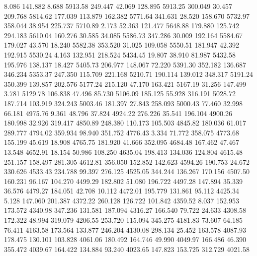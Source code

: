    8.086  141.882    8.688      5913.58
 249.447   42.069  128.895      5913.25
 300.049   30.457  209.768      5814.62
 177.039  113.879  162.382      5771.64
 341.631   28.520  158.670      5732.97
 358.044   38.954  225.737      5710.89
   2.173   52.363  121.477      5648.88
 179.880  125.742  294.183      5610.04
 160.276   30.585   34.085      5586.73
 347.286   30.009  192.164      5584.67
 179.027   43.570   18.240      5582.38
 353.520   31.025  109.058      5550.51
 181.947   42.392  192.915      5530.24
   4.163  132.951  218.524      5434.45
  19.807   38.910   81.987      5432.58
 195.976  138.137   18.427      5405.73
 206.977  148.067   72.220      5391.30
 352.182  136.687  346.234      5353.37
 247.350  115.709  221.168      5210.71
 190.114  139.012  348.317      5191.24
 350.399  139.857  202.576      5177.24
 215.120   47.170  163.421      5167.19
  31.256  147.499    3.781      5129.78
 106.838   47.496   85.730      5106.09
 185.125   55.928  316.191      5028.72
 187.714  103.919  324.243      5003.46
 181.397   27.843  258.093      5000.43
  77.460   32.998   66.181      4975.76
   9.361   48.796   37.824      4924.22
 276.226   35.541  196.104      4900.26
 180.998   32.926  319.417      4850.89
 248.380  110.173  105.503      4845.82
 180.036   61.017  289.777      4794.02
 359.934   98.940  351.752      4776.43
   3.334   71.772  358.075      4773.68
 155.199   45.619   18.908      4765.75
 181.920   41.666  352.095      4684.48
 167.462   47.467   13.548      4652.91
  18.154   50.986  108.250      4635.04
 198.413  134.036  124.804      4615.48
 251.157  158.497  281.305      4612.81
 356.050  152.852  142.623      4594.26
 190.753   24.672  330.626      4533.43
 234.788   99.397  276.125      4525.05
 344.244  136.267  170.156      4507.50
 160.231   96.167  104.270      4499.29
 182.802   51.080  196.722      4497.28
 147.894   35.339   36.576      4479.27
 184.051   42.708   10.112      4472.01
 195.779  131.861   95.112      4425.34
   5.128  147.060  201.387      4372.22
 260.128  126.722  101.842      4359.52
   8.037  152.953  173.572      4340.98
 347.236  131.581  187.094      4316.27
 166.540   79.722   24.633      4308.58
 172.322   48.994  319.079      4206.55
 253.720  115.094  345.275      4181.83
  73.607   64.185   76.411      4163.58
 173.564  133.877  246.204      4130.08
 298.134   25.452  163.578      4087.93
 178.475  130.101  103.828      4061.06
 180.492  164.746   49.990      4049.97
 166.486   46.390  355.472      4039.67
 164.422  134.884   93.240      4023.65
 147.823  153.725  312.729      4021.58
